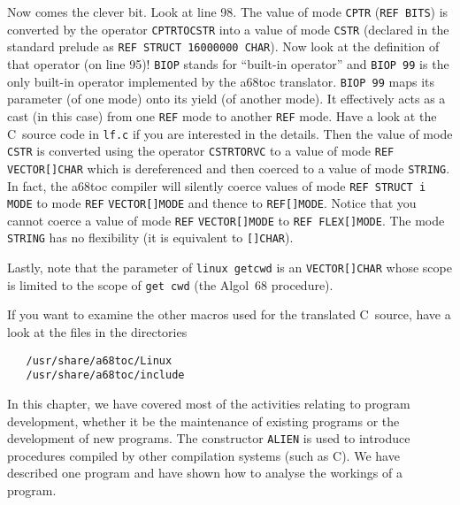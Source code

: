 Now comes the clever bit. Look at line 98. The value of mode
\verb|CPTR| (\verb|REF BITS|) is converted by the operator
\verb|CPTRTOCSTR| into a value of mode \verb|CSTR| (declared in the
standard prelude as \verb|REF STRUCT 16000000 CHAR|). Now look at the
definition of that operator (on line 95)! \verb|BIOP| stands for
``built-in operator'' and \verb|BIOP 99| is the only built-in
operator implemented by the a68toc translator. \verb|BIOP 99| maps
its parameter (of one mode) onto its yield (of another mode). It
effectively acts as a cast (in this case) from one \verb|REF| mode to
another \verb|REF| mode. Have a look at the C~source code in
\verb|lf.c| if you are interested in the details. Then the value of
mode \verb|CSTR| is converted using the operator \verb|CSTRTORVC| to
a value of mode \verb|REF VECTOR[]CHAR| which is dereferenced and
then coerced to a value of mode \verb|STRING|. In fact, the a68toc
compiler will silently coerce values of mode \verb|REF STRUCT i MODE|
to mode \verb|REF| \verb|VECTOR[]MODE| and thence to
\verb|REF[]MODE|.  Notice that you cannot coerce a value of mode
\verb|REF| \verb|VECTOR[]MODE| to \verb|REF FLEX[]MODE|. The mode
\verb|STRING| has no flexibility (it is equivalent to \verb|[]CHAR|).

Lastly, note that the parameter of \verb|linux getcwd| is an
 \verb|VECTOR[]CHAR| whose scope
is limited to the scope of \verb|get cwd| (the Algol~68 procedure).

If you want to examine the other macros used for the translated
C~source, have a look at the files in the directories
\begin{verbatim}
   /usr/share/a68toc/Linux
   /usr/share/a68toc/include
\end{verbatim}
\newpage

In this chapter, we have covered most of the activities relating to
program development, whether it be the maintenance of existing
programs or the development of new programs. The constructor
\verb|ALIEN| is used to introduce procedures compiled by other
compilation systems (such as C). We have described one program
and have shown how to analyse the workings of a program.
